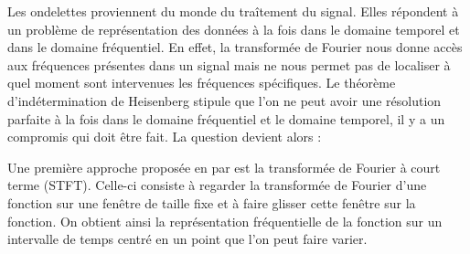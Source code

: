 Les ondelettes proviennent du monde du traîtement du signal. Elles répondent à un problème de représentation des données à la fois dans le domaine temporel et dans le domaine fréquentiel. En effet, la transformée de Fourier nous donne accès aux fréquences présentes dans un signal mais ne nous permet pas de localiser à quel moment sont intervenues les fréquences spécifiques. Le théorème d'indétermination de Heisenberg stipule que l'on ne peut avoir une résolution parfaite à la fois dans le domaine fréquentiel et le domaine temporel, il y a un compromis qui doit être fait. La question devient alors :


Une première approche proposée en 
 par 
est la transformée de Fourier à court terme (STFT). Celle-ci consiste à regarder la transformée de Fourier d'une fonction sur une fenêtre de taille fixe et à faire glisser cette fenêtre sur la fonction. On obtient ainsi la représentation fréquentielle de la fonction sur un intervalle de temps centré en un point que l'on peut faire varier. 

\bigskip

